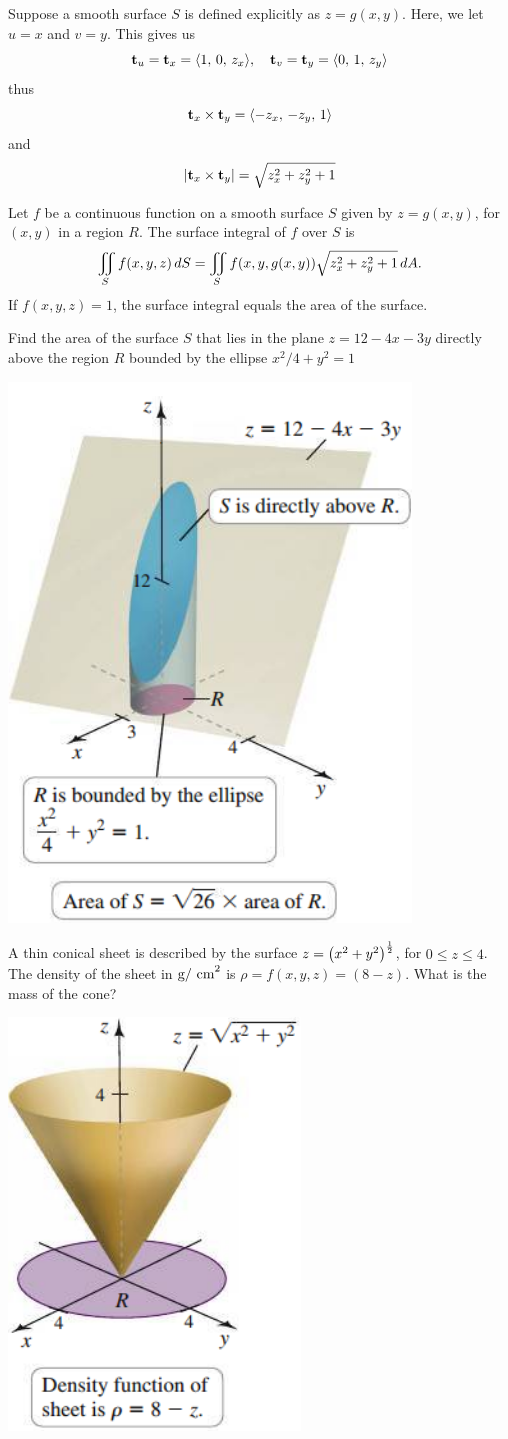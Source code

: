 \documentclass[mathNotesPreamble]{subfiles}
\begin{document}
  Suppose a smooth surface $S$ is defined explicitly as $z=g(x,y)$. Here, we let $u=x$ and $v=y$. This gives us
    \[\mathbf t_u=\mathbf t_x={\left\langle 1,\,0,\,z_x \right\rangle},\quad \mathbf t_v=\mathbf t_y={\left\langle 0,\,1,\,z_y \right\rangle}\]
  thus
    \[\mathbf t_x\times\mathbf t_y={\left\langle -z_x,\,-z_y,\,1 \right\rangle}\]
  and
    \[{\left\vert\mathbf t_x\times\mathbf t_y\right\vert}=\sqrt{z^2_x+z^2_y+1}\]

  \begin{thmBox*}
    Let $f$ be a continuous function on a smooth surface $S$ given by $z=g(x,y)$, for $(x,y)$ in a region $R$. The surface integral of $f$ over $S$ is
      \[\iint\limits_S f(x,y,z)\,dS=\iint\limits_S f{\left(x,y,g(x,y)\right)}\sqrt{z_x^2+z_y^2+1}\,dA.\]
    If $f(x,y,z)=1$, the surface integral equals the area of the surface.
  \end{thmBox*}
  \pagebreak

  \begin{ex*}
    Find the area of the surface $S$ that lies in the plane $z=12-4x-3y$ directly above the region $R$ bounded by the ellipse $x^2/4+y^2=1$
  \end{ex*}
  \begin{flushright}
    \includegraphics[width=0.3\linewidth]{images/briggs_17_06/fig17_53}
  \end{flushright}
  \pagebreak

  \begin{ex*}
    A thin conical sheet is described by the surface $z={\left(x^2+y^2\right)}^{\frac{1}{2}}$, for $0\leq z\leq 4$. The density of the sheet in $\textnormal{g/ cm}^2$ is $\rho=f(x,y,z)=(8-z)$. What is the mass of the cone?
  \end{ex*}
  \begin{flushright}
    \includegraphics[width=0.25\linewidth]{images/briggs_17_06/fig17_54}
  \end{flushright}
  \pagebreak
\end{document}
